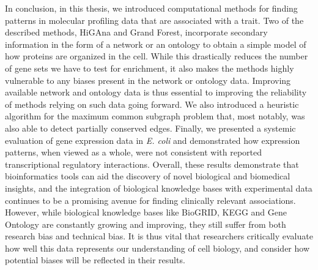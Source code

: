 In conclusion, in this thesis, we introduced computational methods for finding patterns in molecular profiling data that are associated with a trait. Two of the described methods, HiGAna and Grand Forest, incorporate secondary information in the form of a network or an ontology to obtain a simple model of how proteins are organized in the cell. While this drastically reduces the number of gene sets we have to test for enrichment, it also makes the methods highly vulnerable to any biases present in the network or ontology data. Improving available network and ontology data is thus essential to improving the reliability of methods relying on such data going forward. We also introduced a heuristic algorithm for the maximum common subgraph problem that, most notably, was also able to detect partially conserved edges. Finally, we presented a systemic evaluation of gene expression data in \emph{E. coli} and demonstrated how expression patterns, when viewed as a whole, were not consistent with reported transcriptional regulatory interactions.
Overall, these results demonstrate that bioinformatics tools can aid the discovery of novel biological and biomedical insights, and the integration of biological knowledge bases with experimental data continues to be a promising avenue for finding clinically relevant associations. However, while biological knowledge bases like BioGRID, KEGG and Gene Ontology are constantly growing and improving, they still suffer from both research bias and technical bias. It is thus vital that researchers critically evaluate how well this data represents our understanding of cell biology, and consider how potential biases will be reflected in their results.
